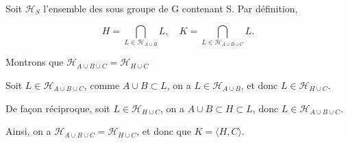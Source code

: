 Soit $\mathcal{H}_S$ l'ensemble des sous groupe de G contenant S. Par définition,

\[H = \displaystyle \bigcap_{L \in \mathcal{H}_{A \cup B}} L,\quad K = \bigcap_{L \in\mathcal{H}_{A \cup B \cup C}} L.\]

Montrons que $ \mathcal{H}_{A \cup B \cup C} = \mathcal{H}_{H \cup C}$


Soit $L \in  \mathcal{H}_{A \cup B \cup C}$, comme $A \cup B \subset L$, on a $L \in  \mathcal{H}_{A \cup B} $, et donc $L \in \mathcal{H}_{H \cup C} $.

De façon réciproque, soit $L \in  \mathcal{H}_{H \cup C}$, on a $A \cup B \subset H \subset L$, donc $L \in  \mathcal{H}_{A \cup B \cup C}$.

Ainsi, on a $ \mathcal{H}_{A \cup B \cup C} = \mathcal{H}_{H \cup C}$, et donc que $K = \langle H, C \rangle$.